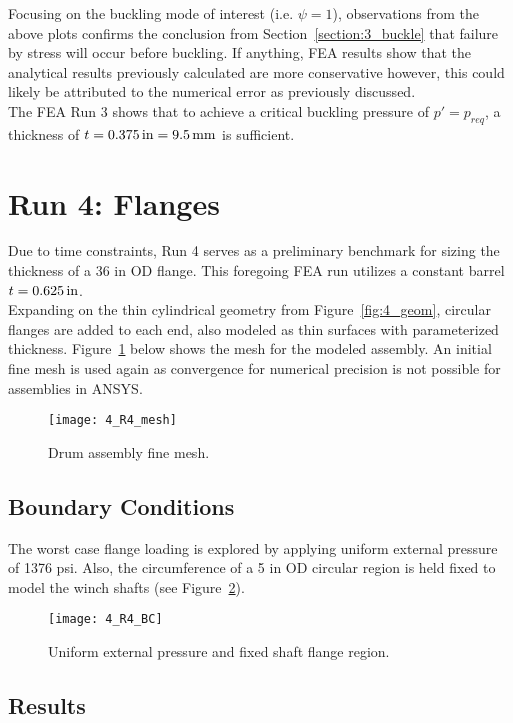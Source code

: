 Focusing on the buckling mode of interest (i.e. $\psi=1$), observations from the above plots confirms the conclusion from Section~\ref{section:3_buckle} that failure by stress will occur before buckling. If anything, FEA results show that the analytical results previously calculated are more conservative however, this could likely be attributed to the numerical error as previously discussed.\\

The FEA Run 3 shows that to achieve a critical buckling pressure of $p'=p_{req}$, a thickness of $t=0.375\,\mathrm{in}=9.5\,\mathrm{mm}$ is sufficient.

\section{Run 4: Flanges}
\label{section:4_R4}
Due to time constraints, Run 4 serves as a preliminary benchmark for sizing the thickness of a 36 in OD flange. This foregoing FEA run utilizes a constant barrel $t=0.625\,\mathrm{in}$.\\

Expanding on the thin cylindrical geometry from Figure~\ref{fig:4_geom}, circular flanges are added to each end, also modeled as thin surfaces with parameterized thickness. Figure~\ref{fig:4_R4_mesh} below shows the mesh for the modeled assembly. An initial fine mesh  is used again as convergence for numerical precision is not possible for assemblies in ANSYS.
\begin{figure}[H]
	\centering
	\texttt{[image: 4\_R4\_mesh]}
	\caption{Drum assembly fine mesh.}
	\label{fig:4_R4_mesh}
\end{figure}

\subsection{Boundary Conditions}

The worst case flange loading is explored by applying uniform external pressure of 1376 psi. Also, the circumference of a 5 in OD circular region is held fixed to model the winch shafts (see Figure~\ref{fig:4_R4_BC}).
\begin{figure}[H]
	\centering
	\texttt{[image: 4\_R4\_BC]}
	\caption{Uniform external pressure and fixed shaft flange region.}
	\label{fig:4_R4_BC}
\end{figure}

\subsection{Results}

